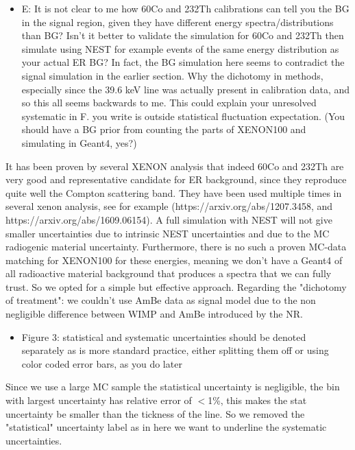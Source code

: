 \documentclass{article}
\begin{document}
\begin{itemize}
	\item {\color{blue} 
E: It is not clear to me how 60Co and 232Th calibrations can tell you
the BG in the signal region, given they have different energy
spectra/distributions than BG? Isn’t it better to validate the
simulation for 60Co and 232Th then simulate using NEST for example
events of the same energy distribution as your actual ER BG? In fact,
the BG simulation here seems to contradict the signal simulation in
the earlier section. Why the dichotomy in methods, especially since
the 39.6 keV line was actually present in calibration data, and so
this all seems backwards to me. This could explain your unresolved
systematic in F. you write is outside statistical fluctuation
expectation. (You should have a BG prior from counting the parts of
XENON100 and simulating in Geant4, yes?)}
\end{itemize}


It has been proven by several XENON analysis that indeed 60Co and 232Th are very good
and representative candidate for ER background, since they reproduce quite well the Compton
scattering band. They have been used multiple times in several xenon analysis, see for 
example (https://arxiv.org/abs/1207.3458, and https://arxiv.org/abs/1609.06154).
A full simulation with NEST will not give smaller uncertainties due to intrinsic
NEST uncertainties and due to the MC radiogenic material uncertainty. 
Furthermore, there is no such a proven MC-data matching for XENON100 for these energies, 
meaning we don't have a Geant4 of all radioactive material 
background that produces a spectra that we can fully trust. So we opted for a simple 
but effective approach. 
Regarding the "dichotomy of treatment": we couldn't use AmBe data as signal model due to 
the non negligible difference between WIMP and AmBe introduced by the NR.


\begin{itemize}
	\item {\color{blue} 
Figure 3: statistical and systematic uncertainties should be denoted
separately as is more standard practice, either splitting them off or
using color coded error bars, as you do later}
\end{itemize}

Since we use a large MC sample the statistical uncertainty is negligible, the bin with largest uncertainty 
has relative error of $<$1\%, this makes the stat uncertainty be smaller than the tickness of the line.
So we removed the "statistical" uncertainty label as in here we want to underline the systematic uncertainties.
\end{document}
